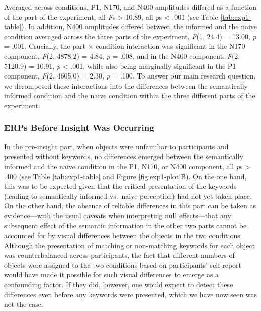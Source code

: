 \documentclass[
  english,
  man,12pt,twoside]{apa7}
\begin{document}
Averaged across conditions, P1, N170, and N400 amplitudes differed as a function of the part of the experiment, all \emph{F}s \textgreater{} 10.89, all \emph{p}s \textless{} .001 (see Table \ref{tab:exp1-table}). In addition, N400 amplitudes differed between the informed and the naive condition averaged across the three parts of the experiment, \emph{F}(1, 24.4) = 13.00, \emph{p} = .001. Crucially, the part × condition interaction was significant in the N170 component, \emph{F}(2, 4878.2) = 4.84, \emph{p} = .008, and in the N400 component, \emph{F}(2, 5120.9) = 10.91, \emph{p} \textless{} .001, while also being marginally significant in the P1 component, \emph{F}(2, 4605.0) = 2.30, \emph{p} = .100. To answer our main research question, we decomposed these interactions into the differences between the semantically informed condition and the naive condition within the three different parts of the experiment.

\hypertarget{erps-before-insight-was-occurring}{%
\subsubsection{ERPs Before Insight Was Occurring}\label{erps-before-insight-was-occurring}}

In the pre-insight part, when objects were unfamiliar to participants and presented without keywords, no differences emerged between the semantically informed and the naive condition in the P1, N170, or N400 component, all \emph{p}s \textgreater{} .400 (see Table \ref{tab:exp1-table} and Figure \ref{fig:exp1-plot}B). On the one hand, this was to be expected given that the critical presentation of the keywords (leading to semantically informed vs.~naive perception) had not yet taken place. On the other hand, the absence of reliable differences in this part can be taken as evidence---with the usual caveats when interpreting null effects---that any subsequent effect of the semantic information in the other two parts cannot be accounted for by visual differences between the objects in the two conditions. Although the presentation of matching or non-matching keywords for each object was counterbalanced across participants, the fact that different numbers of objects were assigned to the two conditions based on participants' self report would have made it possible for such visual differences to emerge as a confounding factor. If they did, however, one would expect to detect these differences even before any keywords were presented, which we have now seen was not the case.
\end{document}
